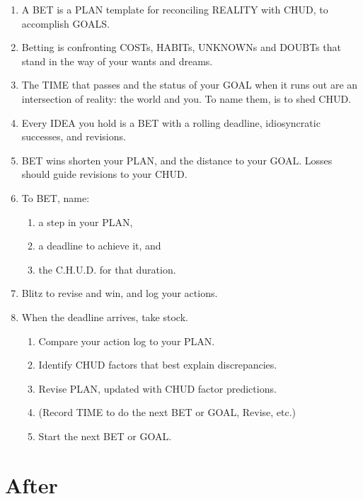 \documentclass[
]{book}
\providecommand{\tightlist}{%
  \setlength{\itemsep}{0pt}\setlength{\parskip}{0pt}}
\begin{document}
\begin{enumerate}
\def\labelenumi{\arabic{enumi}.}
\setcounter{enumi}{23}
\tightlist
\item
  A BET is a PLAN template for reconciling REALITY with CHUD, to accomplish GOALS.
\item
  Betting is confronting COSTs, HABITs, UNKNOWNs and DOUBTs that stand in the way of your wants and dreams.
\item
  The TIME that passes and the status of your GOAL when it runs out are an intersection of reality: the world and you. To name them, is to shed CHUD.
\item
  Every IDEA you hold is a BET with a rolling deadline, idiosyncratic successes, and revisions.
\item
  BET wins shorten your PLAN, and the distance to your GOAL. Losses should guide revisions to your CHUD.
\item
  To BET, name:

  \begin{enumerate}
  \def\labelenumii{\arabic{enumii}.}
  \tightlist
  \item
    a step in your PLAN,
  \item
    a deadline to achieve it, and
  \item
    the C.H.U.D. for that duration.
  \end{enumerate}
\item
  Blitz to revise and win, and log your actions.
\item
  When the deadline arrives, take stock.

  \begin{enumerate}
  \def\labelenumii{\arabic{enumii}.}
  \tightlist
  \item
    Compare your action log to your PLAN.
  \item
    Identify CHUD factors that best explain discrepancies.
  \item
    Revise PLAN, updated with CHUD factor predictions.
  \item
    (Record TIME to do the next BET or GOAL, Revise, etc.)
  \item
    Start the next BET or GOAL.
  \end{enumerate}
\end{enumerate}

\hypertarget{after}{%
\section{After}\label{after}}
\end{document}
